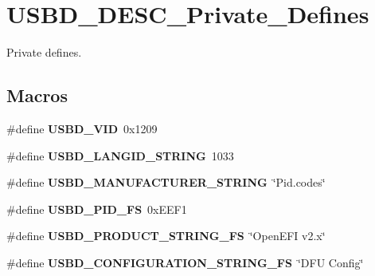 \hypertarget{group__USBD__DESC__Private__Defines}{}\section{U\+S\+B\+D\+\_\+\+D\+E\+S\+C\+\_\+\+Private\+\_\+\+Defines}
\label{group__USBD__DESC__Private__Defines}


Private defines.  


\subsection*{Macros}
\begin{DoxyCompactItemize}
\item 
\mbox{\label{group__USBD__DESC__Private__Defines_gac5251397ce2246b546b472cd802e6d62}} 
\#define {\bfseries U\+S\+B\+D\+\_\+\+V\+ID}~0x1209
\item 
\mbox{\label{group__USBD__DESC__Private__Defines_ga070dd542d4d914e86fdf103fa5fdd72f}} 
\#define {\bfseries U\+S\+B\+D\+\_\+\+L\+A\+N\+G\+I\+D\+\_\+\+S\+T\+R\+I\+NG}~1033
\item 
\mbox{\label{group__USBD__DESC__Private__Defines_gaee0c9fd7e8265b90126028919cd863a6}} 
\#define {\bfseries U\+S\+B\+D\+\_\+\+M\+A\+N\+U\+F\+A\+C\+T\+U\+R\+E\+R\+\_\+\+S\+T\+R\+I\+NG}~\char`\"{}Pid.\+codes\char`\"{}
\item 
\mbox{\label{group__USBD__DESC__Private__Defines_gaa6f9e36da39c9881963cabf42df4d216}} 
\#define {\bfseries U\+S\+B\+D\+\_\+\+P\+I\+D\+\_\+\+FS}~0x\+E\+E\+F1
\item 
\mbox{\label{group__USBD__DESC__Private__Defines_gaa11017e20e3a2f1ef891b86212c4b730}} 
\#define {\bfseries U\+S\+B\+D\+\_\+\+P\+R\+O\+D\+U\+C\+T\+\_\+\+S\+T\+R\+I\+N\+G\+\_\+\+FS}~\char`\"{}Open\+E\+FI v2.\+x\char`\"{}
\item 
\mbox{\label{group__USBD__DESC__Private__Defines_gaca5e66e8b6c89a896f6ad16f9a68128f}} 
\#define {\bfseries U\+S\+B\+D\+\_\+\+C\+O\+N\+F\+I\+G\+U\+R\+A\+T\+I\+O\+N\+\_\+\+S\+T\+R\+I\+N\+G\+\_\+\+FS}~\char`\"{}D\+FU Config\char`\"{}

\end{DoxyCompactItemize}
